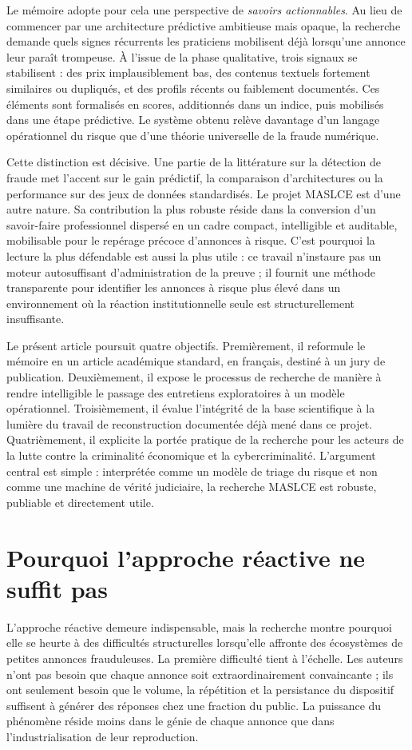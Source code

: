 \documentclass[10pt,a4paper]{article}
\begin{document}
Le mémoire adopte pour cela une perspective de \emph{savoirs actionnables}. Au lieu de commencer par une architecture prédictive ambitieuse mais opaque, la recherche demande quels signes récurrents les praticiens mobilisent déjà lorsqu'une annonce leur paraît trompeuse. À l'issue de la phase qualitative, trois signaux se stabilisent : des prix implausiblement bas, des contenus textuels fortement similaires ou dupliqués, et des profils récents ou faiblement documentés. Ces éléments sont formalisés en scores, additionnés dans un indice, puis mobilisés dans une étape prédictive. Le système obtenu relève davantage d'un langage opérationnel du risque que d'une théorie universelle de la fraude numérique.

Cette distinction est décisive. Une partie de la littérature sur la détection de fraude met l'accent sur le gain prédictif, la comparaison d'architectures ou la performance sur des jeux de données standardisés. Le projet MASLCE est d'une autre nature. Sa contribution la plus robuste réside dans la conversion d'un savoir-faire professionnel dispersé en un cadre compact, intelligible et auditable, mobilisable pour le repérage précoce d'annonces à risque. C'est pourquoi la lecture la plus défendable est aussi la plus utile : ce travail n'instaure pas un moteur autosuffisant d'administration de la preuve ; il fournit une méthode transparente pour identifier les annonces à risque plus élevé dans un environnement où la réaction institutionnelle seule est structurellement insuffisante.

Le présent article poursuit quatre objectifs. Premièrement, il reformule le mémoire en un article académique standard, en français, destiné à un jury de publication. Deuxièmement, il expose le processus de recherche de manière à rendre intelligible le passage des entretiens exploratoires à un modèle opérationnel. Troisièmement, il évalue l'intégrité de la base scientifique à la lumière du travail de reconstruction documentée déjà mené dans ce projet. Quatrièmement, il explicite la portée pratique de la recherche pour les acteurs de la lutte contre la criminalité économique et la cybercriminalité. L'argument central est simple : interprétée comme un modèle de triage du risque et non comme une machine de vérité judiciaire, la recherche MASLCE est robuste, publiable et directement utile.

\section{Pourquoi l'approche réactive ne suffit pas}
L'approche réactive demeure indispensable, mais la recherche montre pourquoi elle se heurte à des difficultés structurelles lorsqu'elle affronte des écosystèmes de petites annonces frauduleuses. La première difficulté tient à l'échelle. Les auteurs n'ont pas besoin que chaque annonce soit extraordinairement convaincante ; ils ont seulement besoin que le volume, la répétition et la persistance du dispositif suffisent à générer des réponses chez une fraction du public. La puissance du phénomène réside moins dans le génie de chaque annonce que dans l'industrialisation de leur reproduction.
\end{document}
